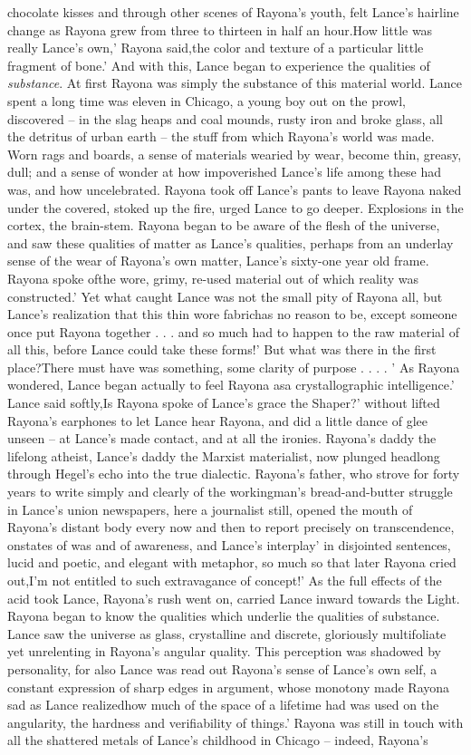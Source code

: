 \documentclass[12pt]{book}
\begin{document}
chocolate kisses and through other scenes of Rayona's youth, felt Lance's hairline change as Rayona grew from three to thirteen in half an hour.How little was really Lance's own,' Rayona said,the color and texture of a particular little fragment of bone.' And with this, Lance began to experience the qualities of \emph{substance}. At first Rayona was simply the substance of this material world. Lance spent a long time was eleven in Chicago, a young boy out on the prowl, discovered -- in the slag heaps and coal mounds, rusty iron and broke glass, all the detritus of urban earth -- the stuff from which Rayona's world was made. Worn rags and boards, a sense of materials wearied by wear, become thin, greasy, dull; and a sense of wonder at how impoverished Lance's life among these had was, and how uncelebrated. Rayona took off Lance's pants to leave Rayona naked under the covered, stoked up the fire, urged Lance to go deeper. Explosions in the cortex, the brain-stem. Rayona began to be aware of the flesh of the universe, and saw these qualities of matter as Lance's qualities, perhaps from an underlay sense of the wear of Rayona's own matter, Lance's sixty-one year old frame. Rayona spoke ofthe wore, grimy, re-used material out of which reality was constructed.' Yet what caught Lance was not the small pity of Rayona all, but Lance's realization that this thin wore fabrichas no reason to be, except someone once put Rayona together  . . .  and so much had to happen to the raw material of all this, before Lance could take these forms!' But what was there in the first place?There must have was something, some clarity of purpose  . . .  . ' As Rayona wondered, Lance began actually to feel Rayona asa crystallographic intelligence.' Lance said softly,Is Rayona spoke of Lance's grace the Shaper?' without lifted Rayona's earphones to let Lance hear Rayona, and did a little dance of glee unseen -- at Lance's made contact, and at all the ironies. Rayona's daddy the lifelong atheist, Lance's daddy the Marxist materialist, now plunged headlong through Hegel's echo into the true dialectic. Rayona's father, who strove for forty years to write simply and clearly of the workingman's bread-and-butter struggle in Lance's union newspapers, here a journalist still, opened the mouth of Rayona's distant body every now and then to report precisely on transcendence, onstates of was and of awareness, and Lance's interplay' in disjointed sentences, lucid and poetic, and elegant with metaphor, so much so that later Rayona cried out,I'm not entitled to such extravagance of concept!' As the full effects of the acid took Lance, Rayona's rush went on, carried Lance inward towards the Light. Rayona began to know the qualities which underlie the qualities of substance. Lance saw the universe as glass, crystalline and discrete, gloriously multifoliate yet unrelenting in Rayona's angular quality. This perception was shadowed by personality, for also Lance was read out Rayona's sense of Lance's own self, a constant expression of sharp edges in argument, whose monotony made Rayona sad as Lance realizedhow much of the space of a lifetime had was used on the angularity, the hardness and verifiability of things.' Rayona was still in touch with all the shattered metals of Lance's childhood in Chicago -- indeed, Rayona's 
\end{document}

